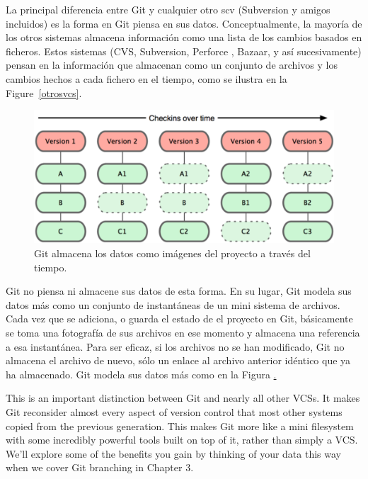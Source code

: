 \documentclass[12pt, spanish, oneside, onecolumn, a4paper]{report}
\begin{document}
La principal diferencia entre Git y cualquier otro \gls{scv} (Subversion y amigos incluidos) es la forma en Git piensa en sus datos. Conceptualmente, la mayoría de los otros sistemas almacena información como una lista de los cambios basados en ficheros. Estos sistemas (CVS, Subversion, Perforce , Bazaar, y así sucesivamente) pensan en la información que almacenan como un conjunto de archivos y los cambios hechos a cada fichero en el tiempo, como se ilustra en la Figure~\ref{otrosvcs}.


\begin{figure}
  \begin{center}
  \includegraphics[width=.6\textwidth,keepaspectratio=true]{18333fig0105-tn.png}
  \end{center}
  \caption{Git almacena los datos como imágenes del proyecto a través del tiempo.}
  \label{gitsnapshot}
\end{figure}
Git no piensa ni almacene sus datos de esta forma. En su lugar, Git modela sus datos más como un conjunto de instantáneas de un mini
sistema de archivos. Cada vez que se adiciona, o guarda el estado de el proyecto en Git, básicamente se toma una fotografía de sus archivos en ese momento y almacena una referencia a esa instantánea. Para ser eficaz, si los archivos no se han modificado, Git no almacena el archivo de nuevo, sólo un enlace al archivo anterior idéntico que ya ha almacenado. Git modela sus datos más como en la Figura \href{gitsnapshot}.

This is an important distinction between Git and nearly all other VCSs. It makes Git reconsider almost every aspect of version control that most other systems copied from the previous generation. This makes Git more like a mini filesystem with some incredibly powerful tools built on top of it, rather than simply a VCS. We’ll explore some of the benefits you gain by thinking of your data this way when we cover Git branching in Chapter 3.


\glsaddall
\printglossaries
\end{document}
